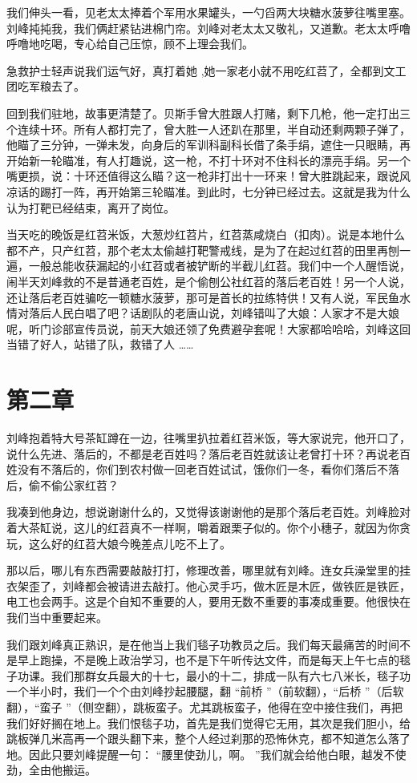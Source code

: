 \documentclass[12pt,twoside,openany]{book}
\begin{document}
我们伸头一看，见老太太捧着个军用水果罐头，一勺舀两大块糖水菠萝往嘴里塞。刘峰扽扽我，我们俩赶紧钻进棉门帘。刘峰对老太太又敬礼，又道歉。老太太呼噜呼噜地吃喝，专心给自己压惊，顾不上理会我们。

急救护士轻声说我们运气好，真打着她 ,她一家老小就不用吃红苕了，全都到文工团吃军粮去了。

回到我们驻地，故事更清楚了。贝斯手曾大胜跟人打赌，剩下几枪，他一定打出三个连续十环。所有人都打完了，曾大胜一人还趴在那里，半自动还剩两颗子弹了，他瞄了三分钟，一弹未发，向身后的军训科副科长借了条手绢，遮住一只眼睛，再开始新一轮瞄准，有人打趣说，这一枪，不打十环对不住科长的漂亮手绢。另一个嘴更损，说：十环还值得这么瞄？这一枪非打出十一环来！曾大胜跳起来，跟说风凉话的踢打一阵，再开始第三轮瞄准。到此时，七分钟已经过去。这就是我为什么认为打靶已经结束，离开了岗位。

当天吃的晚饭是红苕米饭，大葱炒红苕片，红苕蒸咸烧白（扣肉）。说是本地什么都不产，只产红苕，那个老太太偷越打靶警戒线，是为了在起过红苕的田里再刨一遍，一般总能收获漏起的小红苕或者被铲断的半截儿红苕。我们中一个人醒悟说，闹半天刘峰救的不是普通老百姓，是个偷刨公社红苕的落后老百姓！另一个人说，还让落后老百姓骗吃一顿糖水菠萝，那可是首长的拉练特供！又有人说，军民鱼水情对落后人民白唱了吧？话剧队的老唐山说，刘峰错叫了大娘：人家才不是大娘呢，听门诊部宣传员说，前天大娘还领了免费避孕套呢！大家都哈哈哈，刘峰这回当错了好人，站错了队，救错了人 ……

\chapter{第二章}

刘峰抱着特大号茶缸蹲在一边，往嘴里扒拉着红苕米饭，等大家说完，他开口了，说什么先进、落后的，不都是老百姓吗？落后老百姓就该让老曾打十环？再说老百姓没有不落后的，你们到农村做一回老百姓试试，饿你们一冬，看你们落后不落后，偷不偷公家红苕？

我凑到他身边，想说谢谢什么的，又觉得该谢谢他的是那个落后老百姓。刘峰脸对着大茶缸说，这儿的红苕真不一样啊，嚼着跟栗子似的。你个小穗子，就因为你贪玩，这么好的红苕大娘今晚差点儿吃不上了。

那以后，哪儿有东西需要敲敲打打，修理改善，哪里就有刘峰。连女兵澡堂里的挂衣架歪了，刘峰都会被请进去敲打。他心灵手巧，做木匠是木匠，做铁匠是铁匠，电工也会两手。这是个自知不重要的人，要用无数不重要的事凑成重要。他很快在我们当中重要起来。

我们跟刘峰真正熟识，是在他当上我们毯子功教员之后。我们每天最痛苦的时间不是早上跑操，不是晚上政治学习，也不是下午听传达文件，而是每天上午七点的毯子功课。我们那群女兵最大的十七，最小的十二，排成一队有六七八米长，毯子功一个半小时，我们一个个由刘峰抄起腰腿，翻 “前桥 ”（前软翻），“后桥 ”（后软翻），“蛮子 ”（侧空翻），跳板蛮子。尤其跳板蛮子，他得在空中接住我们，再把我们好好搁在地上。我们恨毯子功，首先是我们觉得它无用，其次是我们胆小，给跳板弹几米高再一个跟头翻下来，整个人经过刹那的恐怖休克，都不知道怎么落了地。因此只要刘峰提醒一句： “腰里使劲儿，啊。 ”我们就会给他白眼，越发不使劲，全由他搬运。
\end{document}
